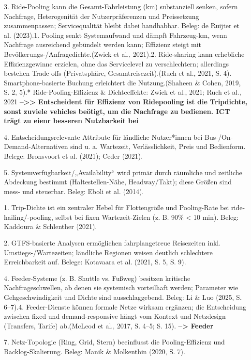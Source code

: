 3. Ride-Pooling kann die Gesamt-Fahrleistung (km) substanziell senken, sofern Nachfrage, Heterogenität der Nutzerpräferenzen und Preissetzung zusammenpassen; Servicequalität bleibt dabei handhabbar. Beleg: de Ruijter et al. (2023).1. Pooling senkt Systemaufwand und dämpft Fahrzeug-km, wenn Nachfrage ausreichend gebündelt werden kann; Effizienz steigt mit Bevölkerungs-/Anfragedichte.(Zwick et al., 2021).2. Ride-sharing kann erhebliche Effizienzgewinne erzielen, ohne das Servicelevel zu verschlechtern; allerdings bestehen Trade-offs (Privatsphäre, Gesamtreisezeit).(Ruch et al., 2021, S. 4). Smartphone-basierte Buchung erleichtert die Nutzung.(Shaheen \& Cohen, 2019, S. 2, 5).* Ride-Pooling-Effizienz \& Dichteeffekte: Zwick et al., 2021; Ruch et al., 2021
\textbf{-->> Entscheident für Effizienz von Ridepooling ist die Tripdichte, sonst zuviele vehicles beötigt, um die Nachfrage zu bedienen. ICT trägt zu eienr besseren Nutzbarkeit bei}

4. Entscheidungsrelevante Attribute für ländliche Nutzer*innen bei Bus-/On-Demand-Alternativen sind u. a. Wartezeit, Verlässlichkeit, Preis und Bedienform. Belege: Bronsvoort et al. (2021); Ceder (2021).

5. Systemverfügbarkeit/„Availability“ wird primär durch räumliche und zeitliche Abdeckung bestimmt (Haltestellen-Nähe, Headway/Takt); diese Größen sind mess- und steuerbar. Beleg: Eboli et al. (2014).

1. Trip-Dichte ist ein zentraler Hebel für Flottengröße und Pooling-Rate bei ride-hailing/-pooling, selbst bei fixen Wartezeit-Zielen (z. B. 90\% < 10 min). Beleg: Kaddoura \& Schlenther (2021).

2. GTFS-basierte Analysen ermöglichen fahrplangetreue Reisezeiten inkl. Umstiegs-/Wartezeiten; ländliche Regionen weisen deutlich schlechtere Erreichbarkeit auf. Belege: Kotavaara et al. (2021, S. 5, S. 9).

4. Feeder-Systeme (z. B. Shuttle vs. Fußweg) besitzen kritische Nachfrageschwellen, ab denen sie systemisch vorteilhaft werden; Parameter wie Gehgeschwindigkeit und Dichte sind ausschlaggebend. Beleg: Li \& Luo (2025, S. 6–7).4. Feeder-Dienste können formale Netze wirksam ergänzen; die Entscheidung zwischen fixed und demand-responsive hängt vom Kontext und Netzdesign (Transfers, Tarife) ab.(McLeod et al., 2017, S. 4–5; S. 15).
\textbf{--> Feeder}

7. Netz-Topologie (Ring, Grid, Stern) beeinflusst die Pooling-Effizienz und Backlog-Skalierung. Beleg: Manik \& Molkenthin (2020, S. 7).





